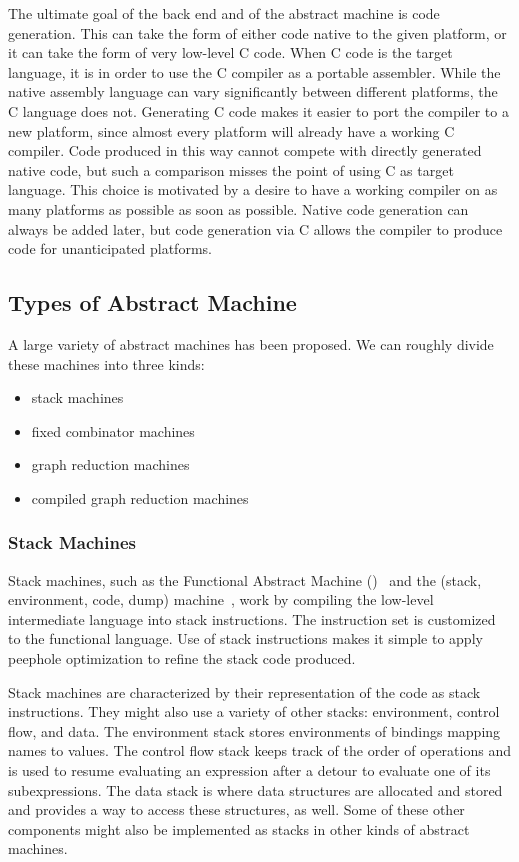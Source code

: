 The ultimate goal of the back end and of the abstract machine is code generation. This can take the form of either code native to the given platform, or it can take the form of very low-level C code. When C code is the target language, it is in order to use the C compiler as a portable assembler. While the native assembly language can vary significantly between different platforms, the C language does not. Generating C code makes it easier to port the compiler to a new platform, since almost every platform will already have a working C compiler. Code produced in this way cannot compete with directly generated native code, but such a comparison misses the point of using C as target language. This choice is motivated by a desire to have a working compiler on as many platforms as possible as soon as possible. Native code generation can always be added later, but code generation via C allows the compiler to produce code for unanticipated platforms.

\subsection{Types of Abstract Machine}
A large variety of abstract machines has been proposed. We can roughly divide these machines into three kinds:
\begin{itemize}
\item
stack machines

\item
fixed combinator machines

\item
graph reduction machines

\item
compiled graph reduction machines
\end{itemize}

\subsubsection[Stack]{Stack Machines}
Stack machines, such as the Functional Abstract Machine ()~\citep{Cardelli:Compiling:1984} and the  (stack, environment, code, dump) machine~\citep{Landin:The-Mechanical:1964}, work by compiling the low-level intermediate language into stack instructions. The instruction set is customized to the functional language. Use of stack instructions makes it simple to apply peephole optimization to refine the stack code produced.

Stack machines are characterized by their representation of the code as stack instructions. They might also use a variety of other stacks: environment, control flow, and data. The environment stack stores environments of bindings mapping names to values. The control flow stack keeps track of the order of operations and is used to resume evaluating an expression after a detour to evaluate one of its subexpressions. The data stack is where data structures are allocated and stored and provides a way to access these structures, as well. Some of these other components might also be implemented as stacks in other kinds of abstract machines.

